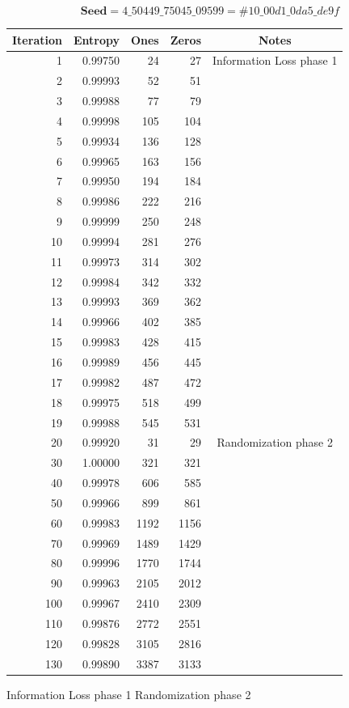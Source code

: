 \documentclass[letterpaper]{article}
\begin{document}
\begin{center}
$$\textbf{Seed} = 4\_50449\_75045\_09599 = \#10\_00d1\_0da5\_de9f$$
\begin{tabular}{|r|r|r|r|c|}
\hline
\textbf{Iteration} & \textbf{Entropy} & \textbf{Ones} & \textbf{Zeros} & \textbf{Notes}\\
\hline
1 & 0.99750 & 24 & 27 & Information Loss phase 1 \\
2 & 0.99993 & 52 & 51 & \\
3 & 0.99988 & 77 & 79 & \\
4 & 0.99998 & 105 & 104 & \\
5 & 0.99934 & 136 & 128 & \\
6 & 0.99965 & 163 & 156 & \\
7 & 0.99950 & 194 & 184 & \\
8 & 0.99986 & 222 & 216 & \\
9 & 0.99999 & 250 & 248 & \\
10 & 0.99994 & 281 & 276 & \\
11 & 0.99973 & 314 & 302 & \\
12 & 0.99984 & 342 & 332 & \\
13 & 0.99993 & 369 & 362 & \\
14 & 0.99966 & 402 & 385 & \\
15 & 0.99983 & 428 & 415 & \\
16 & 0.99989 & 456 & 445 & \\
17 & 0.99982 & 487 & 472 & \\
18 & 0.99975 & 518 & 499 & \\
19 & 0.99988 & 545 & 531 & \\
\hline
20 & 0.99920 & 31 & 29  & Randomization phase 2 \\
30 & 1.00000 & 321 & 321 & \\
40 & 0.99978 & 606 & 585 & \\
50 & 0.99966 & 899 & 861 & \\
60 & 0.99983 & 1192 & 1156 & \\
70 & 0.99969 & 1489 & 1429 & \\
80 & 0.99996 & 1770 & 1744 & \\
90 & 0.99963 & 2105 & 2012 & \\
100 & 0.99967 & 2410 & 2309 & \\
110 & 0.99876 & 2772 & 2551 & \\
120 & 0.99828 & 3105 & 2816 & \\
130 & 0.99890 & 3387 & 3133 & \\
\hline
\end{tabular}

\vspace{0.5cm}

\begin{minipage}{0.8\textwidth}
\raggedright
Information Loss phase 1
Randomization phase 2
\end{minipage}
\end{center}
\end{document}
